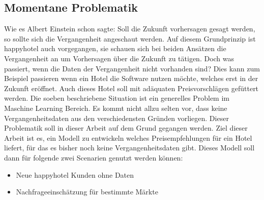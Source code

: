 \subsection{Momentane Problematik}
\label{subsec:problematik}
Wie es Albert Einstein schon sagte: Soll die Zukunft vorhersagen gesagt werden, so sollte sich die Vergangenheit angeschaut werden. Auf diesem Grundprinzip ist happyhotel auch vorgegangen, sie schauen sich bei beiden Ansätzen die Vergangenheit an um Vorhersagen über die Zukunft zu tätigen. 
\newline
\newline
Doch was passiert, wenn die Daten der Vergangenheit nicht vorhanden sind? Dies kann zum Beispiel passieren wenn ein Hotel die Software nutzen möchte, welches erst in der Zukunft eröffnet. Auch dieses Hotel soll mit adäquaten Preisvorschlägen gefüttert werden.
Die soeben beschriebene Situation ist ein generelles Problem im Maschine Learning Bereich. Es kommt nicht allzu selten vor, dass keine Vergangenheitsdaten aus den verschiedensten Gründen vorliegen. Dieser Problematik soll in dieser Arbeit auf dem Grund gegangen werden. 
\newline
\newline
Ziel dieser Arbeit ist es,  ein Modell zu entwickeln welches Preisempfehlungen für ein Hotel liefert, für das es bisher noch keine Vergangenheitsdaten gibt. Dieses Modell soll dann für folgende zwei Scenarien genutzt werden können:
\begin{itemize}
    \item Neue happyhotel Kunden ohne Daten
    \item Nachfrageeinschätzung für bestimmte Märkte
\end{itemize}